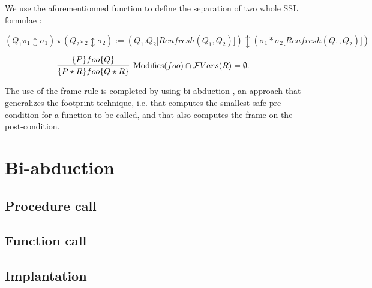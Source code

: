\documentclass[a4paper,twoside,12pt]{report}
\newcommand{\Unsep}[0]{\ast}
\newcommand{\Sep}[2]{#1 \Unsep #2}
\newcommand{\Sepf}[2]{ #1 \star #2}
\newcommand{\Formula}[2]{ #1  \updownarrow #2}
\newcommand{\FVars}[1]{\mathcal{F}Vars(#1)}
\newcommand{\renfresh}[2]{Renfresh(#1,#2)}
\begin{document}
We use the aforementionned function to define the separation of two whole SSL formulae :

$$
\Sepf{(\Formula{Q_1 \pi_1}{\sigma_1})}{(\Formula{Q_2 \pi_2}{\sigma_2})} := \Formula{(Q_1.Q_2\lbrack \renfresh{Q_1}{Q_2}\rbrack)}{(\Sep{\sigma_1}{\sigma_2\lbrack \renfresh{Q_1}{Q_2}\rbrack})}
$$ 

$$
\infer[\mbox{Modifies}(foo) \cap \FVars{R}=\emptyset.
]{\lbrace \Sepf{P}{R} \rbrace foo \lbrace \Sepf{Q}{R}\rbrace}{\lbrace P \rbrace foo \lbrace Q\rbrace} \gspace $$


The use of the frame rule is completed by using bi-abduction \cite{BiAbduction09}, an approach that generalizes the footprint technique, i.e. that computes the
smallest safe pre-condition for a function to be called, and that also computes
the frame on the post-condition.

\section{Bi-abduction}


\subsection{Procedure call}

\subsection{Function call}

\subsection{Implantation} 




\end{document}
